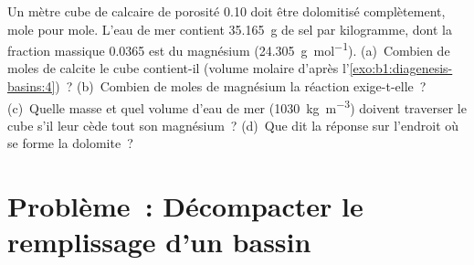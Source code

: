 \begin{exercise}[$\star\star\star$]\label{exo:b1:diagenesis-basins:12}
Un mètre cube de calcaire de porosité \num{0.10} doit être dolomitisé
complètement, mole pour mole. L'eau de mer contient \qty{35.165}{g} de sel par kilogramme,
dont la fraction massique \num{0.0365} est du magnésium (\qty{24.305}{g.mol^{-1}}).
(a)~Combien de moles de calcite le cube contient-il (volume molaire d'après
l'\cref{exo:b1:diagenesis-basins:4})~? (b)~Combien de moles de magnésium la
réaction exige-t-elle~? (c)~Quelle masse et quel volume d'eau de mer
(\qty{1030}{kg.m^{-3}}) doivent traverser le cube s'il leur cède tout son
magnésium~? (d)~Que dit la réponse sur l'endroit où se forme la dolomite~?
\end{exercise}

\section{Problème~: Décompacter le remplissage d'un bassin}

